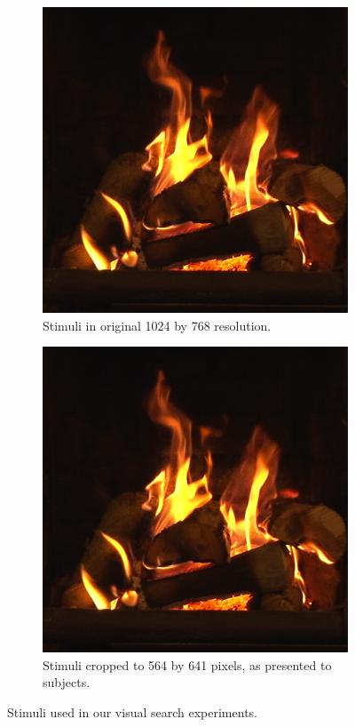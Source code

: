\begin{figure}[htp]
\centering

\begin{subfigure}[b]{\textwidth}
\centering
                \includegraphics[width=12cm]{img/frame00000.png}
                \caption{Stimuli in original 1024 by 768 resolution.}
          
        \end{subfigure}

\begin{subfigure}[b]{\textwidth}
\centering
                \includegraphics[width=12cm]{img/frame00000.png}
                \caption{Stimuli cropped to 564 by 641 pixels, as presented to subjects.}
          
        \end{subfigure}

\caption{Stimuli used in our visual search experiments.}
\end{figure}

